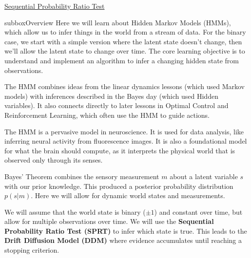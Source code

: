 \begin{textbox}{\href{https://compneuro.neuromatch.io/tutorials/W3D2_HiddenDynamics/student/W3D2_Tutorial1.html}{Sequential Probability Ratio Test }   }
\begin{subbox}{subbox}{Overview}
\scriptsize
Here we will learn about Hidden Markov Models (HMMs), which allow us to infer things in the world from a stream of data. For the binary case, we start with a simple version where the latent state doesn’t change, then we’ll allow the latent state to change over time. The core learning objective is to understand and implement an algorithm to infer a changing hidden state from observations.

The HMM combines ideas from the linear dynamics lessons (which used Markov models) with inferences described in the Bayes day (which used Hidden variables). It also connects directly to later lessons in Optimal Control and Reinforcement Learning, which often use the HMM to guide actions.

The HMM is a pervasive model in neuroscience. It is used for data analysis, like inferring neural activity from fluorescence images. It is also a foundational model for what the brain should compute, as it interprets the physical world that is observed only through its senses.

Bayes' Theorem combines the sensory measurement $m$ about a latent variable $s$ with our prior knowledge. This produced a posterior probability distribution $p(s|m)$. Here we will allow for dynamic world states and measurements.

 We will assume that the world state is binary ($\pm 1$) and constant over time, but allow for multiple observations over time. We will use the \textbf{Sequential Probability Ratio Test (SPRT)} to infer which state is true. This leads to the \textbf{Drift Diffusion Model (DDM)} where evidence accumulates until reaching a stopping criterion.

\end{subbox}



\end{textbox}
